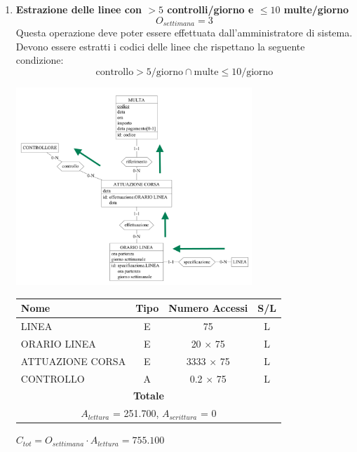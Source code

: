 \documentclass[12pt,a4paper]{report}
\begin{document}
\begin{enumerate}[label=\textbf{\arabic*)}]
	\item \textbf{Estrazione delle linee con $>5$ controlli/giorno e $\leq 10$ multe/giorno} \label{op13} \\
	\[{O_{settimana} = 3}\]
	Questa operazione deve poter essere effettuata dall'amministratore di sistema.\\
	Devono essere estratti i codici delle linee che rispettano la seguente condizione:
	\[
	\text{controllo} > 5/\text{giorno} \cap \text{multe} \leq 10/\text{giorno}
	\]

	\begin{center}
	\includegraphics[width=0.7\textwidth]{VisualLineeMulteControlli}
	\end{center}

	\begin{table}[H]
	\centering
	\begin{tabular}{|l|c|c|c|}
	\hline
	Nome & Tipo & Numero Accessi & S/L \\
	\hline
	LINEA & E & 75 & L \\
	\hline
	ORARIO LINEA & E & 20 $\times$ 75 & L \\
	\hline
	ATTUAZIONE CORSA & E & 3333 $\times$ 75 & L \\
	\hline
	CONTROLLO & A & 0.2 $\times$ 75 & L \\
	    \hline
	    \multicolumn{4}{c}{\textbf{Totale}} \\
	    \multicolumn{4}{c}{${A_{lettura}}$ = 251.700, ${A_{scrittura}}$ = 0} \\
	    \hline
	\end{tabular}
	\end{table}
	    \begin{center}
	    ${C_{tot} = {O_{settimana}}\cdot {A_{lettura}} = 755.100}$
	    \end{center}


\end{enumerate}
\end{document}
